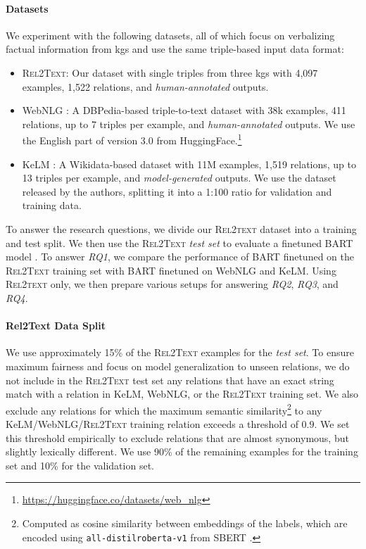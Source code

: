 \paragraph*{Datasets}  We experiment with the following datasets, all of which focus on verbalizing factual information from \acp{kg} and use the same triple-based input data format:
\begin{itemize}
    \item \textsc{Rel2Text}: Our dataset with single triples from three \acp{kg} with 4,097 examples, 1,522 relations, and \textit{human-annotated} outputs.
    \item WebNLG \cite{ferreira20202020,gardentWebNLGChallengeGenerating2017}: A DBPedia-based triple-to-text dataset with 38k examples, 411 relations, up to 7 triples per example, and \textit{human-annotated} outputs. We use the English part of version 3.0 from HuggingFace.\footnote{\url{https://huggingface.co/datasets/web_nlg}}
    \item KeLM \cite{agarwalKnowledgeGraphBased2021}: A Wikidata-based dataset with 11M examples, 1,519 relations, up to 13 triples per example, and \textit{model-generated} outputs. We use the dataset released by the authors, splitting it into a 1:100 ratio for validation and training data.
\end{itemize}
To answer the research questions, we divide our \textsc{Rel2text} dataset into a training and test split. We then use the \textsc{Rel2Text} \emph{test set} to evaluate a finetuned BART model \cite{lewisBARTDenoisingSequencetoSequence2019}. To answer \emph{RQ1}, we compare the performance of BART finetuned on the \textsc{Rel2Text} training set with BART finetuned on WebNLG and KeLM. Using \textsc{Rel2text} only, we then prepare various setups for answering \emph{RQ2}, \emph{RQ3}, and \emph{RQ4}.


\paragraph{Rel2Text Data Split} We use approximately 15\% of the \textsc{Rel2Text} examples for the \emph{test set}. To ensure maximum fairness and focus on model generalization to unseen relations, we do not include in the \textsc{Rel2Text} test set any relations that have an exact string match with a relation in KeLM, WebNLG, or the \textsc{Rel2Text} training set. We also exclude any relations for which the maximum semantic similarity\footnote{Computed as cosine similarity between embeddings of the labels, which are encoded using \texttt{all-distilroberta-v1} from SBERT \cite{reimers-gurevych-2019-sentence}.} to any KeLM/WebNLG/\textsc{Rel2Text} training relation exceeds a threshold of $0.9$. We set this threshold empirically to exclude relations that are almost synonymous, but slightly lexically different.
We use 90\% of the remaining examples for the training set and 10\% for the validation set.

